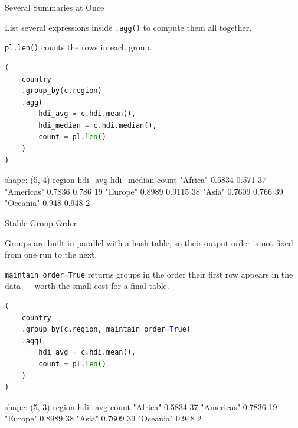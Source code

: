 \documentclass[8pt,aspectratio=169]{beamer}
\begin{document}
\begin{frame}[fragile]{Several Summaries at Once}
\begin{splitcode}{%

List several expressions inside \texttt{.agg()} to compute them all together.

\texttt{pl.len()} counts the rows in each group.

}
\begin{lstlisting}[language=Python]
(
    country
    .group_by(c.region)
    .agg(
        hdi_avg = c.hdi.mean(),
        hdi_median = c.hdi.median(),
        count = pl.len()
    )
)
\end{lstlisting}
\begin{codeoutput}
shape: (5, 4)
region      hdi_avg  hdi_median  count
"Africa"    0.5834   0.571       37
"Americas"  0.7836   0.786       19
"Europe"    0.8989   0.9115      38
"Asia"      0.7609   0.766       39
"Oceania"   0.948    0.948       2
\end{codeoutput}
\end{splitcode}
\end{frame}

\begin{frame}[fragile]{Stable Group Order}
\begin{splitcode}{%

Groups are built in parallel with a hash table, so their output order is not fixed from one run to the next.

\texttt{maintain\_order=True} returns groups in the order their first row appears in the data --- worth the small cost for a final table.

}
\begin{lstlisting}[language=Python]
(
    country
    .group_by(c.region, maintain_order=True)
    .agg(
        hdi_avg = c.hdi.mean(),
        count = pl.len()
    )
)
\end{lstlisting}
\begin{codeoutput}
shape: (5, 3)
region      hdi_avg  count
"Africa"    0.5834   37
"Americas"  0.7836   19
"Europe"    0.8989   38
"Asia"      0.7609   39
"Oceania"   0.948    2
\end{codeoutput}
\end{splitcode}
\end{frame}
\end{document}
